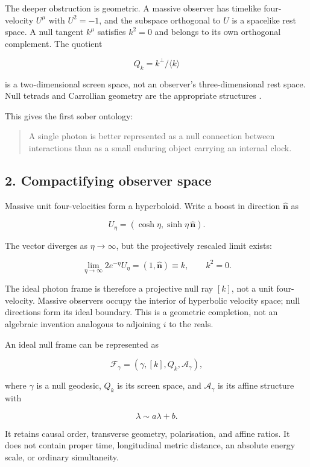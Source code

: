 \documentclass[
]{article}
\begin{document}
The deeper obstruction is geometric. A massive observer has timelike
four-velocity \(U^\mu\) with \(U^2=-1\), and the subspace orthogonal to
\(U\) is a spacelike rest space. A null tangent \(k^\mu\) satisfies
\(k^2=0\) and belongs to its own orthogonal complement. The quotient

\[
Q_k=k^\perp/\langle k\rangle
\]

is a two-dimensional screen space, not an observer's three-dimensional
rest space. Null tetrads and Carrollian geometry are the appropriate
structures .

This gives the first sober ontology:

\begin{quote}
A single photon is better represented as a null connection between
interactions than as a small enduring object carrying an internal clock.
\end{quote}

\subsection{2. Compactifying observer
space}\label{compactifying-observer-space}

Massive unit four-velocities form a hyperboloid. Write a boost in
direction \(\hat{\mathbf n}\) as

\[
U_\eta=(\cosh\eta,\sinh\eta\,\hat{\mathbf n}).
\]

The vector diverges as \(\eta\rightarrow\infty\), but the projectively
rescaled limit exists:

\[
\lim_{\eta\to\infty}2e^{-\eta}U_\eta
=(1,\hat{\mathbf n})
\equiv k,
\qquad k^2=0.
\]

The ideal photon frame is therefore a projective null ray \([k]\), not a
unit four-velocity. Massive observers occupy the interior of hyperbolic
velocity space; null directions form its ideal boundary. This is a
geometric completion, not an algebraic invention analogous to adjoining
\(i\) to the reals.

An ideal null frame can be represented as

\[
\mathcal F_\gamma=(\gamma,[k],Q_k,\mathcal A_\gamma),
\]

where \(\gamma\) is a null geodesic, \(Q_k\) is its screen space, and
\(\mathcal A_\gamma\) is its affine structure with

\[
\lambda\sim a\lambda+b.
\]

It retains causal order, transverse geometry, polarisation, and affine
ratios. It does not contain proper time, longitudinal metric distance,
an absolute energy scale, or ordinary simultaneity.
\end{document}
